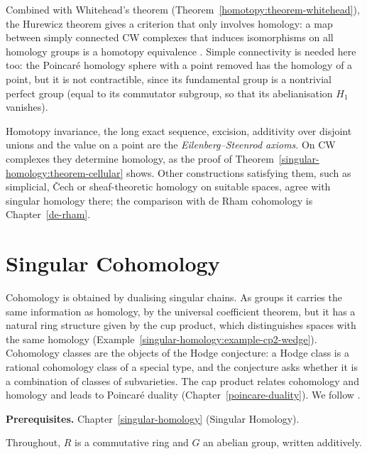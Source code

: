 \begin{remark}\label{singular-homology:remark-homology-whitehead}
Combined with Whitehead's theorem (Theorem~\ref{homotopy:theorem-whitehead}), the Hurewicz theorem gives a criterion that only involves homology: a map between simply connected CW complexes that
induces isomorphisms on all homology groups is a homotopy equivalence \cite[Corollary 4.33]{hatcher-at}. Simple connectivity is needed here too: the Poincar\'e homology sphere with a point
removed has the homology of a point, but it is not contractible, since its fundamental group is a nontrivial perfect group (equal to its commutator subgroup, so that its abelianisation $H_1$
vanishes).
\end{remark}

\begin{remark}\label{singular-homology:remark-eilenberg-steenrod}
Homotopy invariance, the long exact sequence, excision, additivity over disjoint unions and the value on a point are the \emph{Eilenberg--Steenrod axioms}. On
CW complexes they determine homology, as the proof of Theorem~\ref{singular-homology:theorem-cellular} shows. Other constructions satisfying them, such as
simplicial, \v{C}ech or sheaf-theoretic homology on suitable spaces, agree with singular homology there; the comparison with de Rham cohomology is
Chapter~\ref{de-rham}.
\end{remark}

\section{Singular Cohomology}\label{singular-homology:section-singular-cohomology}
Cohomology is obtained by dualising singular chains. As groups it carries the same information as homology, by the universal
coefficient theorem, but it has a natural ring structure given by the cup product, which distinguishes spaces with the same
homology (Example~\ref{singular-homology:example-cp2-wedge}). Cohomology classes are the objects of the Hodge conjecture: a
Hodge class is a rational cohomology class of a special type, and the conjecture asks whether it is a combination of classes of
subvarieties. The cap product relates cohomology and homology and leads to Poincar\'e duality (Chapter~\ref{poincare-duality}).
We follow \cite[Chapter 3]{hatcher-at}.

\noindent\textbf{Prerequisites.} Chapter~\ref{singular-homology} (Singular Homology).

Throughout, $R$ is a commutative ring and $G$ an abelian group, written additively.

